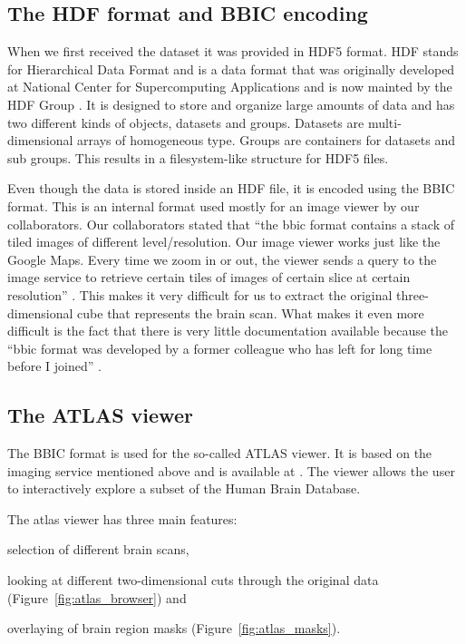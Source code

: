 \subsection{The HDF format and BBIC encoding}

When we first received the dataset it was provided in HDF5 format. HDF stands for Hierarchical Data Format and is a data format that was originally developed at National Center for Supercomputing Applications  and is now mainted by the HDF Group \cite{HDF5:website}. It is designed to store and organize large amounts of data and has two different kinds of objects, datasets and groups. Datasets are multi-dimensional arrays of homogeneous type. Groups are containers for datasets and sub groups. This results in a filesystem-like structure for HDF5 files. 

Even though the data is stored inside an HDF file, it is encoded using the BBIC format. This is an internal format used mostly for an image viewer by our collaborators. Our collaborators stated that ``the bbic format contains a stack of tiled images of different level/resolution. Our image viewer works just like the Google Maps. Every time we zoom in or out, the viewer sends a query to the image service to retrieve certain tiles of images of certain slice at certain resolution'' \cite{BBIC:about}. This makes it very difficult for us to extract the original three-dimensional cube that represents the brain scan. What makes it even more difficult is the fact that there is very little documentation available because the  ``bbic format was developed by a former colleague who has left for long time before I joined'' \cite{BBIC:dev}.

\subsection{The ATLAS viewer}

The BBIC format is used for the so-called ATLAS viewer. It is based on the imaging service mentioned above and is available at \cite{hbp:atlasviewer}. The viewer allows the user to interactively explore a subset of the Human Brain Database. 

The atlas viewer has three main features: 
\begin{inparaenum}[(1)]
\item selection of different brain scans, 
\item looking at different two-dimensional cuts through the original data (Figure~\ref{fig:atlas_browser}) and
\item overlaying of brain region masks (Figure~\ref{fig:atlas_masks}). 
\end{inparaenum}

